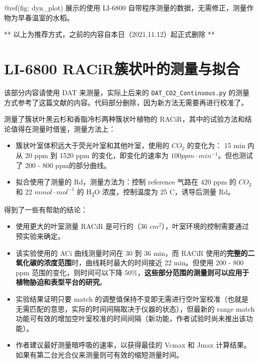 \documentclass[
]{krantz}
\renewenvironment{quote}{\begin{VF}}{\end{VF}}
\begin{document}
@ref(fig: dyn\_plot) 展示的使用 LI-6800 自带程序测量的数据，无需修正，测量作物为早春温室的水稻。

** 以上为推荐方式，之前的内容自本日（2021.11.12）起正式删除 **

\hypertarget{racir-conifer}{%
\section{\texorpdfstring{LI-6800 RACiR\texttrademark 簇状叶的测量与拟合}{LI-6800 RACiR簇状叶的测量与拟合}}\label{racir-conifer}}

\begin{quote}
该部分内容请使用 DAT 来测量，实际上后来的 \texttt{DAT\_CO2\_Continuous.py} 的测量方式参考了这篇文献的内容。代码部分删除，因为新方法无需要再进行校准了。
\end{quote}

\citet{Coursolle12019} 测量了簇状叶黑云杉和香脂冷杉两种簇状叶植物的 RACiR，其中的试验方法和结论值得在测量时借鉴，测量方法上：

\begin{itemize}
\item
  簇状叶室体积远大于荧光叶室和其他叶室，使用的 \(CO_2\) 的变化为： 15 min 内从 20 ppm 到 1520 ppm 的变化，即变化的速率为 \(100 ppm \cdot min^{-1}\)。但也测试了 200 - 800 ppm的部分曲线。
\item
  拟合使用了测量的 Rd，测量方法为：控制 reference 气路在 420 ppm 的 \(CO_2\) 和 22 \(mmol \cdot mol^{-1}\) 的 H\textsubscript{2}O 浓度，控制温度为 25 C，诱导后测量 Rd。
\end{itemize}

得到了一些有帮助的结论：

\begin{itemize}
\item
  使用更大的叶室测量 RACiR 是可行的（36 \(cm^2\)），叶室环境的控制需要通过预实验来确定。
\item
  该实验使用的 ACi 曲线测量时间在 30 到 36 min，而 RACiR 使用的\textbf{完整的二氧化碳的浓度范围}时，曲线耗时最大的时间接近 22 min。但使用 200 - 800 ppm 范围的变化，则时间可以下降 50\%，\textbf{这些部分范围的测量则可以应用于植物胁迫和表型平台的研究}。
\item
  实验结果证明只要 match 的调整值保持不变即无需进行空叶室校准（也就是无需匹配的意思，实际的时间间隔取决于仪器的状态），但最新的 range match 功能可有效的增加空叶室校准的时间间隔（新功能，作者试验时尚未推出该功能）。
\item
  作者建议最好测量暗呼吸的速率，以获得最佳的 Vcmax 和 Jmax 计算结果。如果有第二台光合仪来测量则可有效的缩短测量时间。
\end{itemize}
\end{document}

